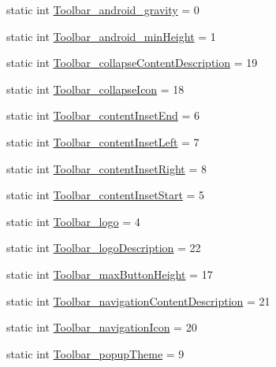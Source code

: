 \begin{DoxyCompactItemize}
\item 
static int \hyperlink{classandroid_1_1support_1_1v4_1_1R_1_1styleable_ac91be82152f33f614697a5b2014cb489}{Toolbar\+\_\+android\+\_\+gravity} = 0
\item 
static int \hyperlink{classandroid_1_1support_1_1v4_1_1R_1_1styleable_a0d3b075d587ebf9dd415672f35ff77a2}{Toolbar\+\_\+android\+\_\+min\+Height} = 1
\item 
static int \hyperlink{classandroid_1_1support_1_1v4_1_1R_1_1styleable_a4cbc87868c5e4c8ff2456bc78168f833}{Toolbar\+\_\+collapse\+Content\+Description} = 19
\item 
static int \hyperlink{classandroid_1_1support_1_1v4_1_1R_1_1styleable_adc48ca7e6b4af1cbf953aca1ddd4dc52}{Toolbar\+\_\+collapse\+Icon} = 18
\item 
static int \hyperlink{classandroid_1_1support_1_1v4_1_1R_1_1styleable_a32c9d8c6dd8f327b1ee2c2fe3ab0a630}{Toolbar\+\_\+content\+Inset\+End} = 6
\item 
static int \hyperlink{classandroid_1_1support_1_1v4_1_1R_1_1styleable_ac27607dd846e87108d867c8f656dc01f}{Toolbar\+\_\+content\+Inset\+Left} = 7
\item 
static int \hyperlink{classandroid_1_1support_1_1v4_1_1R_1_1styleable_aa53bacd1f9f065115238222bc4ca4f5d}{Toolbar\+\_\+content\+Inset\+Right} = 8
\item 
static int \hyperlink{classandroid_1_1support_1_1v4_1_1R_1_1styleable_ae49023876e1eb052f0650805f60750f1}{Toolbar\+\_\+content\+Inset\+Start} = 5
\item 
static int \hyperlink{classandroid_1_1support_1_1v4_1_1R_1_1styleable_a02896a17125399cab8807ad63d4b9bf2}{Toolbar\+\_\+logo} = 4
\item 
static int \hyperlink{classandroid_1_1support_1_1v4_1_1R_1_1styleable_a189537d807b0fafbff95c6fc64aba407}{Toolbar\+\_\+logo\+Description} = 22
\item 
static int \hyperlink{classandroid_1_1support_1_1v4_1_1R_1_1styleable_a6b04787e5b1049d59002016f695019df}{Toolbar\+\_\+max\+Button\+Height} = 17
\item 
static int \hyperlink{classandroid_1_1support_1_1v4_1_1R_1_1styleable_a6160a902fc7264d07ae23eb1d7d2e966}{Toolbar\+\_\+navigation\+Content\+Description} = 21
\item 
static int \hyperlink{classandroid_1_1support_1_1v4_1_1R_1_1styleable_a661ed648518af5edf2636cb075a4fbbe}{Toolbar\+\_\+navigation\+Icon} = 20
\item 
static int \hyperlink{classandroid_1_1support_1_1v4_1_1R_1_1styleable_a6383da799d3eb15b2f73a0b40c936a2f}{Toolbar\+\_\+popup\+Theme} = 9

\end{DoxyCompactItemize}
